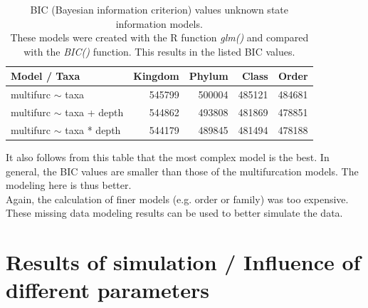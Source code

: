       \begin{table}[h!]
        \begin{center}
          \begin{tabular}{ |l|r|r|r|r| }
            \hline
            \bfseries Model / Taxa & \bfseries Kingdom & \bfseries Phylum & \bfseries Class & \bfseries Order \\
            \hline \hline
            multifurc $\sim$ taxa & \cellcolor{green!15}545799 & \cellcolor{green!35}500004 & \cellcolor{green!45}485121 & \cellcolor{green!45}484681 \\
            \hline
            multifurc $\sim$ taxa + depth & \cellcolor{green!15}544862 & \cellcolor{green!40}493808 & \cellcolor{green!45}481869 & \cellcolor{green!50}478851 \\
            \hline
            multifurc $\sim$ taxa * depth & \cellcolor{green!15}544179 & \cellcolor{green!45}489845 & \cellcolor{green!45}481494 & \cellcolor{green!50}478188 \\
            \hline
          \end{tabular} 
        \end{center}
        \caption{BIC (Bayesian information criterion) values unknown state information models. \\
          These models were created with the R function \textit{glm()} and compared with the 
            \textit{BIC()} function. This results in the listed BIC values.}
        \label{table:BIC unknown information} 
      \end{table}
      It also follows from this table that the most complex model is the best. In general, the BIC 
        values are smaller than those of the multifurcation models. The modeling here is thus better. \\
      Again, the calculation of finer models (e.g. order or family) was too expensive. \\

      These missing data modeling results can be used to better simulate the data.

  \section{Results of simulation / Influence of different parameters} \label{sec:results - simulation}
  
